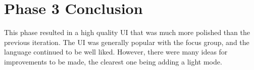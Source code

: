 \section{Phase 3 Conclusion}
This phase resulted in a high quality UI that was much more polished than the previous iteration. The UI was generally popular with the focus group, and the language continued to be well liked. However, there were many ideas for improvements to be made, the clearest one being adding a light mode. 


